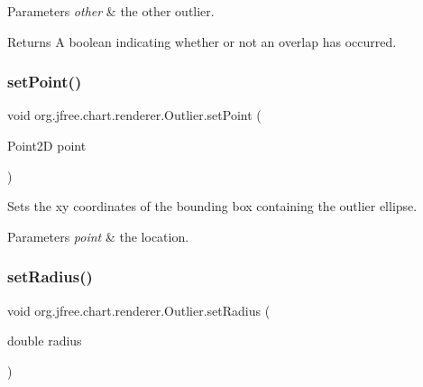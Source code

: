 \begin{DoxyParams}{Parameters}
{\em other} & the other outlier.\\
\hline
\end{DoxyParams}
\begin{DoxyReturn}{Returns}
A {\ttfamily boolean} indicating whether or not an overlap has occurred. 
\end{DoxyReturn}
\mbox{\label{classorg_1_1jfree_1_1chart_1_1renderer_1_1_outlier_a0ed1a867a65ba0e2cb62d35646c28b3e}} 
\subsubsection{\texorpdfstring{set\+Point()}{setPoint()}}
{\footnotesize\ttfamily void org.\+jfree.\+chart.\+renderer.\+Outlier.\+set\+Point (\begin{DoxyParamCaption}\item[{Point2D}]{point }\end{DoxyParamCaption})}

Sets the xy coordinates of the bounding box containing the outlier ellipse.


\begin{DoxyParams}{Parameters}
{\em point} & the location. \\
\hline
\end{DoxyParams}
\mbox{\label{classorg_1_1jfree_1_1chart_1_1renderer_1_1_outlier_ab70f46de517fda671d08bd00f11b72e5}} 
\subsubsection{\texorpdfstring{set\+Radius()}{setRadius()}}
{\footnotesize\ttfamily void org.\+jfree.\+chart.\+renderer.\+Outlier.\+set\+Radius (\begin{DoxyParamCaption}\item[{double}]{radius }\end{DoxyParamCaption})}

